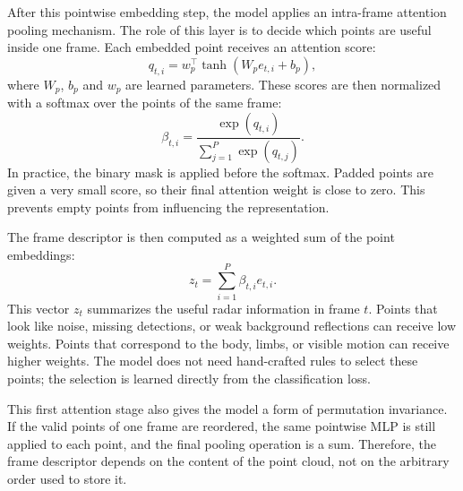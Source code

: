 \documentclass[10pt,twocolumn]{article}
\begin{document}
After this pointwise embedding step, the model applies an intra-frame attention
pooling mechanism. The role of this layer is to decide which points are useful
inside one frame. Each embedded point receives an attention score:
\[
    q_{t,i} = w_p^\top \tanh(W_p e_{t,i} + b_p),
\]
where $W_p$, $b_p$ and $w_p$ are learned parameters. These scores are then
normalized with a softmax over the points of the same frame:
\[
    \beta_{t,i} =
    \frac{\exp(q_{t,i})}{\sum_{j=1}^{P} \exp(q_{t,j})}.
\]
In practice, the binary mask is applied before the softmax. Padded points are
given a very small score, so their final attention weight is close to zero.
This prevents empty points from influencing the representation.

The frame descriptor is then computed as a weighted sum of the point embeddings:
\[
    z_t = \sum_{i=1}^{P} \beta_{t,i} e_{t,i}.
\]
This vector $z_t$ summarizes the useful radar information in frame $t$. Points
that look like noise, missing detections, or weak background reflections can
receive low weights. Points that correspond to the body, limbs, or visible
motion can receive higher weights. The model does not need hand-crafted rules to
select these points; the selection is learned directly from the classification
loss.

This first attention stage also gives the model a form of permutation
invariance. If the valid points of one frame are reordered, the same pointwise
MLP is still applied to each point, and the final pooling operation is a sum.
Therefore, the frame descriptor depends on the content of the point cloud, not
on the arbitrary order used to store it.
\end{document}
